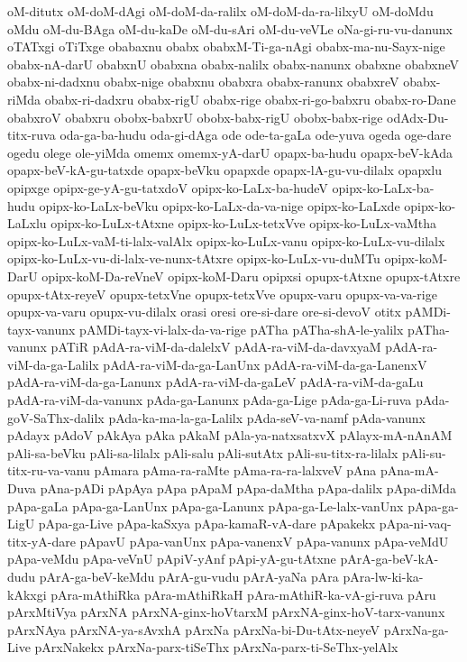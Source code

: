 {oM-ditutx
oM-doM-dAgi
oM-doM-da-ralilx
oM-doM-da-ra-lilxyU
oM-doMdu
oMdu
oM-du-BAga
oM-du-kaDe
oM-du-sAri
oM-du-veVLe
oNa-gi-ru-vu-danunx
oTATxgi
oTiTxge
obabaxnu
obabx
obabxM-Ti-ga-nAgi
obabx-ma-nu-Sayx-nige
obabx-nA-darU
obabxnU
obabxna
obabx-nalilx
obabx-nanunx
obabxne
obabxneV
obabx-ni-dadxnu
obabx-nige
obabxnu
obabxra
obabx-ranunx
obabxreV
obabx-riMda
obabx-ri-dadxru
obabx-rigU
obabx-rige
obabx-ri-go-babxru
obabx-ro-Dane
obabxroV
obabxru
obobx-babxrU
obobx-babx-rigU
obobx-babx-rige
odAdx-Du-titx-ruva
oda-ga-ba-hudu
oda-gi-dAga
ode
ode-ta-gaLa
ode-yuva
ogeda
oge-dare
ogedu
olege
ole-yiMda
omemx
omemx-yA-darU
opapx-ba-hudu
opapx-beV-kAda
opapx-beV-kA-gu-tatxde
opapx-beVku
opapxde
opapx-lA-gu-vu-dilalx
opapxlu
opipxge
opipx-ge-yA-gu-tatxdoV
opipx-ko-LaLx-ba-hudeV
opipx-ko-LaLx-ba-hudu
opipx-ko-LaLx-beVku
opipx-ko-LaLx-da-va-nige
opipx-ko-LaLxde
opipx-ko-LaLxlu
opipx-ko-LuLx-tAtxne
opipx-ko-LuLx-tetxVve
opipx-ko-LuLx-vaMtha
opipx-ko-LuLx-vaM-ti-lalx-valAlx
opipx-ko-LuLx-vanu
opipx-ko-LuLx-vu-dilalx
opipx-ko-LuLx-vu-di-lalx-ve-nunx-tAtxre
opipx-ko-LuLx-vu-duMTu
opipx-koM-DarU
opipx-koM-Da-reVneV
opipx-koM-Daru
opipxsi
opupx-tAtxne
opupx-tAtxre
opupx-tAtx-reyeV
opupx-tetxVne
opupx-tetxVve
opupx-varu
opupx-va-va-rige
opupx-va-varu
opupx-vu-dilalx
orasi
oresi
ore-si-dare
ore-si-devoV
otitx
pAMDi-tayx-vanunx
pAMDi-tayx-vi-lalx-da-va-rige
pATha
pATha-shA-le-yalilx
pATha-vanunx
pATiR
pAdA-ra-viM-da-dalelxV
pAdA-ra-viM-da-davxyaM
pAdA-ra-viM-da-ga-Lalilx
pAdA-ra-viM-da-ga-LanUnx
pAdA-ra-viM-da-ga-LanenxV
pAdA-ra-viM-da-ga-Lanunx
pAdA-ra-viM-da-gaLeV
pAdA-ra-viM-da-gaLu
pAdA-ra-viM-da-vanunx
pAda-ga-Lanunx
pAda-ga-Lige
pAda-ga-Li-ruva
pAda-goV-SaThx-dalilx
pAda-ka-ma-la-ga-Lalilx
pAda-seV-va-namf
pAda-vanunx
pAdayx
pAdoV
pAkAya
pAka
pAkaM
pAla-ya-natxsatxvX
pAlayx-mA-nAnAM
pAli-sa-beVku
pAli-sa-lilalx
pAli-salu
pAli-sutAtx
pAli-su-titx-ra-lilalx
pAli-su-titx-ru-va-vanu
pAmara
pAma-ra-raMte
pAma-ra-ra-lalxveV
pAna
pAna-mA-Duva
pAna-pADi
pApAya
pApa
pApaM
pApa-daMtha
pApa-dalilx
pApa-diMda
pApa-gaLa
pApa-ga-LanUnx
pApa-ga-Lanunx
pApa-ga-Le-lalx-vanUnx
pApa-ga-LigU
pApa-ga-Live
pApa-kaSxya
pApa-kamaR-vA-dare
pApakekx
pApa-ni-vaq-titx-yA-dare
pApavU
pApa-vanUnx
pApa-vanenxV
pApa-vanunx
pApa-veMdU
pApa-veMdu
pApa-veVnU
pApiV-yAnf
pApi-yA-gu-tAtxne
pArA-ga-beV-kA-dudu
pArA-ga-beV-keMdu
pArA-gu-vudu
pArA-yaNa
pAra
pAra-lw-ki-ka-kAkxgi
pAra-mAthiRka
pAra-mAthiRkaH
pAra-mAthiR-ka-vA-gi-ruva
pAru
pArxMtiVya
pArxNA
pArxNA-ginx-hoVtarxM
pArxNA-ginx-hoV-tarx-vanunx
pArxNAya
pArxNA-ya-sAvxhA
pArxNa
pArxNa-bi-Du-tAtx-neyeV
pArxNa-ga-Live
pArxNakekx
pArxNa-parx-tiSeThx
pArxNa-parx-ti-SeThx-yelAlx
}
